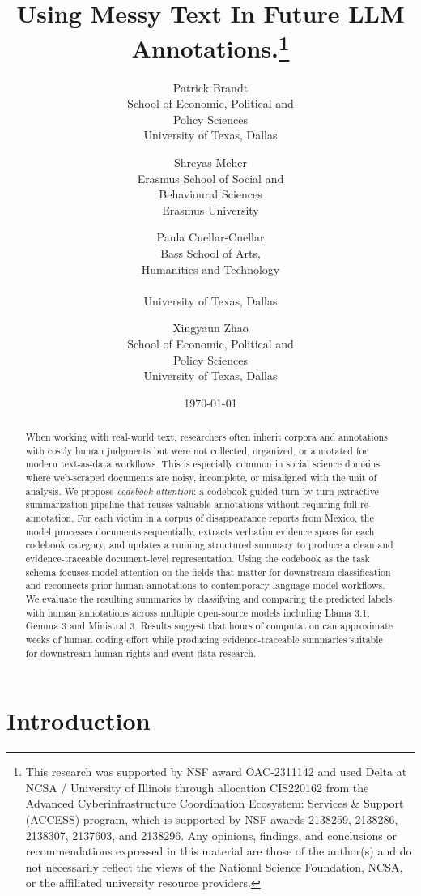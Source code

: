 \documentclass{article}
\title{Using Messy Text In  Future LLM Annotations.\footnote{This research was supported by NSF award OAC-2311142 and 
used Delta at NCSA / University of Illinois through allocation CIS220162 from the Advanced Cyberinfrastructure Coordination Ecosystem: Services \& Support (ACCESS) program, which is supported by NSF awards 2138259, 2138286, 2138307, 2137603, and 2138296. Any opinions, findings, and conclusions or recommendations expressed
in this material are those of the author(s) and do not necessarily
reflect the views of the National Science Foundation,  NCSA, or the
affiliated university resource providers.}}
\author{Patrick Brandt \\ School of Economic, Political and \\ Policy Sciences \\ University of Texas, Dallas\\ \email{pbrandt@utdallas.edu}
\and Shreyas Meher \\ Erasmus School of Social and\\ Behavioural Sciences\\ Erasmus University \\
\email{meher@essb.eur.nl}
\and Paula Cuellar-Cuellar \\ Bass School of Arts, \\ Humanities and Technology \\ \email{email}  \\ University of Texas, Dallas\\
\and Xingyaun Zhao \\ School of Economic, Political and \\ Policy Sciences \\ University of Texas, Dallas\\ \email{email}}
\date{\today}
\begin{document}
\maketitle
\begin{abstract}



When working with real-world text, researchers often inherit corpora and annotations with costly human judgments but were not collected, organized, or annotated for modern text-as-data workflows. This is especially common in social science domains where web-scraped documents are noisy, incomplete, or misaligned with the unit of analysis.
We propose \emph{codebook attention}: a codebook-guided turn-by-turn extractive summarization pipeline that reuses valuable annotations without requiring full re-annotation. For each victim in a corpus of disappearance reports from Mexico, the model processes documents sequentially, extracts verbatim evidence spans for each codebook category, and updates a running structured summary to produce a clean and evidence-traceable document-level representation. Using the codebook as the task schema focuses model attention on the fields that matter for downstream classification and reconnects prior human annotations to contemporary language model workflows. We evaluate the resulting summaries by classifying and comparing the predicted labels with human annotations across multiple open-source models including Llama 3.1, Gemma 3 and Ministral 3. %
Results suggest that hours of computation can approximate weeks of human coding effort while producing evidence-traceable summaries suitable for downstream human rights and event data research.
\end{abstract}

\newpage

\section{Introduction}\label{introduction}
\end{document}
